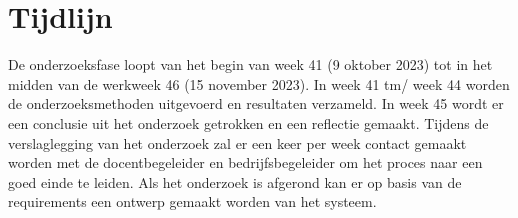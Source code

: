 \section{Tijdlijn}
De onderzoeksfase loopt van het begin van week 41 (9 oktober 2023) tot in het midden van de werkweek 46 (15 november 2023).
In week 41 tm/ week 44 worden de onderzoeksmethoden uitgevoerd en resultaten verzameld.
In week 45 wordt er een conclusie uit het onderzoek getrokken en een reflectie gemaakt.
Tijdens de verslaglegging van het onderzoek zal er een keer per week contact gemaakt worden met de docentbegeleider en bedrijfsbegeleider om het proces naar een goed einde te leiden.
Als het onderzoek is afgerond kan er op basis van de requirements een ontwerp gemaakt worden van het systeem.
